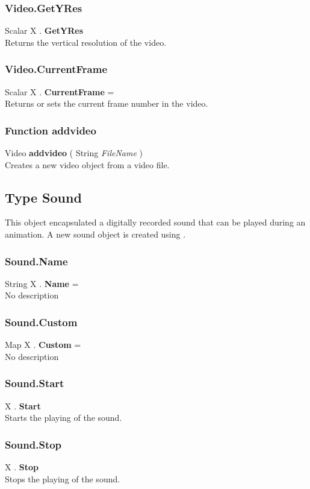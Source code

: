 \subsubsection{Video.GetYRes \label{F:Video:GetYRes}}
Scalar X . \textbf{GetYRes} \\
Returns the vertical resolution of the video.

\subsubsection{Video.CurrentFrame \label{F:Video:CurrentFrame}}
Scalar X . \textbf{CurrentFrame} = \\
Returns or sets the current frame number in the video.

\subsubsection{Function addvideo \label{F:addvideo}}
Video \textbf{addvideo} ( String \textit{FileName} ) \\
Creates a new video object from a video file.

\subsection{Type Sound \label{T:Sound}}
This object encapsulated a digitally recorded sound that can be played during an animation. A new sound object is created using .

\subsubsection{Sound.Name \label{F:Sound:Name}}
String X . \textbf{Name} = \\
No description

\subsubsection{Sound.Custom \label{F:Sound:Custom}}
Map X . \textbf{Custom} = \\
No description

\subsubsection{Sound.Start \label{F:Sound:Start}}
X . \textbf{Start} \\
Starts the playing of the sound.

\subsubsection{Sound.Stop \label{F:Sound:Stop}}
X . \textbf{Stop} \\
Stops the playing of the sound.

